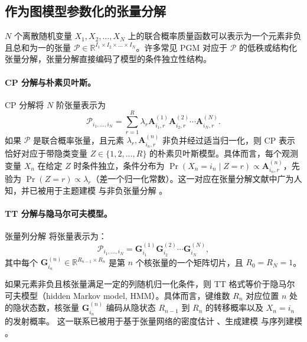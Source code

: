 \documentclass[11pt]{article}
\newcommand{\R}{\mathbb{R}}
\newcommand{\ten}[1]{\mathcal{#1}}
\newcommand{\mat}[1]{\mathbf{#1}}
\begin{document}
\subsection{作为图模型参数化的张量分解}

$N$ 个离散随机变量 $X_1,X_2,\dots, X_N$ 上的联合概率质量函数可以表示为一个元素非负且总和为一的张量 $\ten{P} \in \R^{I_1 \times I_2\times \dots \times I_N}$。许多常见 PGM 对应于 $\ten{P}$ 的低秩或结构化张量分解，张量分解直接编码了模型的条件独立性结构。

\paragraph{CP 分解与朴素贝叶斯。}
CP 分解将 $N$ 阶张量表示为
\begin{equation}
\ten{P}_{i_1,\dots,i_N} = \sum_{r=1}^{R} \lambda_r \mat{A}^{(1)}_{i_1,r} \mat{A}^{(2)}_{i_2,r} \cdots \mat{A}^{(N)}_{i_N,r}.
\end{equation}
如果 $\ten{P}$ 是联合概率张量，且元素 $\lambda_r, \mat{A}^{(n)}_{i_n,r}$ 非负并经过适当归一化，则 CP 表示恰好对应于带隐类变量 $Z \in \{1,2,\dots,R\}$ 的朴素贝叶斯模型。具体而言，每个观测变量 $X_n$ 在给定 $Z$ 时条件独立，条件分布为 $\Pr(X_n = i_n \mid Z = r) \propto \mat{A}^{(n)}_{i_n,r}$，先验为 $\Pr(Z = r) \propto \lambda_r$（差一个归一化常数）。这一对应在张量分解文献中广为人知，并已被用于主题建模 \cite{anandkumar2014tensor} 与非负张量分解 \cite{cichocki2009nonnegative}。


\paragraph{TT 分解与隐马尔可夫模型。}
张量列分解 \cite{oseledets2011tensor} 将张量表示为：
\begin{equation}
\ten{P}_{i_1,\dots,i_N} = \mat{G}^{(1)}_{i_1} \mat{G}^{(2)}_{i_2} \cdots \mat{G}^{(N)}_{i_N},
\end{equation}
其中每个 $\mat{G}^{(n)}_{i_n} \in \R^{R_{n-1} \times R_n}$ 是第 $n$ 个核张量的一个矩阵切片，且 $R_0 = R_N = 1$。

如果元素非负且核张量满足一定的列随机归一化条件，则 TT 格式等价于隐马尔可夫模型（hidden Markov model, HMM）\cite{glasser2019expressive}。具体而言，键维数 $R_n$ 对应位置 $n$ 处的隐状态数，核张量 $\mat{G}^{(n)}_{i_n}$ 编码从隐状态 $R_{n-1}$ 到 $R_n$ 的转移概率以及 $X_n = i_n$ 的发射概率。
这一联系已被用于基于张量网络的密度估计 \cite{han2018unsupervised}、生成建模 \cite{glasser2020probabilistic} 与序列建模 \cite{stoudenmire2016supervised}。
\end{document}
